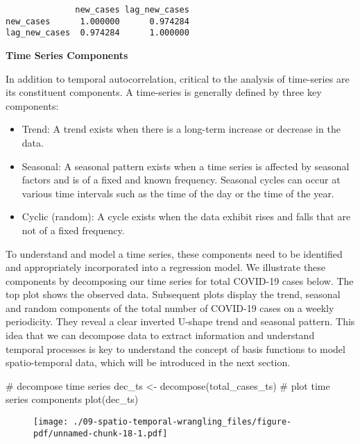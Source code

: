 \documentclass[
  letterpaper,
  krantz2]{style/krantz}
\newenvironment{Shaded}{\begin{snugshade}}{\end{snugshade}}
\newcommand{\CommentTok}[1]{\textcolor[rgb]{0.37,0.37,0.37}{#1}}
\newcommand{\FunctionTok}[1]{\textcolor[rgb]{0.28,0.35,0.67}{#1}}
\newcommand{\NormalTok}[1]{\textcolor[rgb]{0.00,0.23,0.31}{#1}}
\newcommand{\OtherTok}[1]{\textcolor[rgb]{0.00,0.23,0.31}{#1}}
\begin{document}
\begin{verbatim}
              new_cases lag_new_cases
new_cases      1.000000      0.974284
lag_new_cases  0.974284      1.000000
\end{verbatim}

\textbf{Time Series Components}

In addition to temporal autocorrelation, critical to the analysis of
time-series are its constituent components. A time-series is generally
defined by three key components:

\begin{itemize}
\item
  Trend: A trend exists when there is a long-term increase or decrease
  in the data.
\item
  Seasonal: A seasonal pattern exists when a time series is affected by
  seasonal factors and is of a fixed and known frequency. Seasonal
  cycles can occur at various time intervals such as the time of the day
  or the time of the year.
\item
  Cyclic (random): A cycle exists when the data exhibit rises and falls
  that are not of a fixed frequency.
\end{itemize}

To understand and model a time series, these components need to be
identified and appropriately incorporated into a regression model. We
illustrate these components by decomposing our time series for total
COVID-19 cases below. The top plot shows the observed data. Subsequent
plots display the trend, seasonal and random components of the total
number of COVID-19 cases on a weekly periodicity. They reveal a clear
inverted U-shape trend and seasonal pattern. This idea that we can
decompose data to extract information and understand temporal processes
is key to understand the concept of basis functions to model
spatio-temporal data, which will be introduced in the next section.

\begin{Shaded}
\begin{Highlighting}[]
\CommentTok{\# decompose time series}
\NormalTok{dec\_ts }\OtherTok{\textless{}{-}} \FunctionTok{decompose}\NormalTok{(total\_cases\_ts)}
\CommentTok{\# plot time series components}
\FunctionTok{plot}\NormalTok{(dec\_ts)}
\end{Highlighting}
\end{Shaded}

\begin{figure}[H]

{\centering \texttt{[image: ./09-spatio-temporal-wrangling\_files/figure-pdf/unnamed-chunk-18-1.pdf]}

}

\end{figure}
\end{document}
